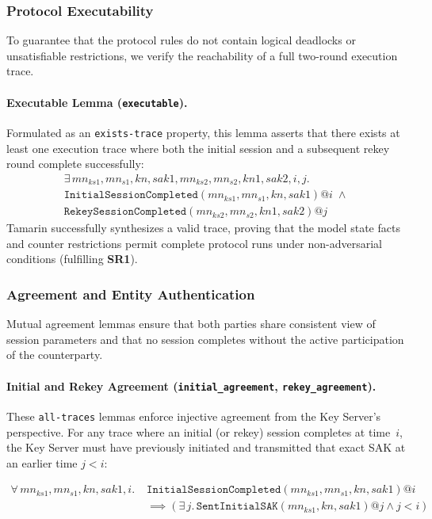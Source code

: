 \subsubsection{Protocol Executability}
To guarantee that the protocol rules do not contain logical deadlocks or unsatisfiable restrictions, we verify the reachability of a full two-round execution trace.

\paragraph{Executable Lemma (\texttt{executable}).} Formulated as an \texttt{exists-trace} property, this lemma asserts that there exists at least one execution trace where both the initial session and a subsequent rekey round complete successfully:
\begin{align*}
\exists \, \mathit{mn_{ks1}}, \mathit{mn_{s1}}, \mathit{kn}, \mathit{sak1}, \mathit{mn_{ks2}}, \mathit{mn_{s2}}, \mathit{kn1}, \mathit{sak2}, i, j. \\
\mathtt{InitialSessionCompleted}(\mathit{mn_{ks1}},\mathit{mn_{s1}},\mathit{kn},\mathit{sak1})@i \;\land \\
\mathtt{RekeySessionCompleted}(\mathit{mn_{ks2}},\mathit{mn_{s2}},\mathit{kn1},\mathit{sak2})@j
\end{align*}
Tamarin successfully synthesizes a valid trace, proving that the model state facts and counter restrictions permit complete protocol runs under non-adversarial conditions (fulfilling \textbf{SR1}).

\subsubsection{Agreement and Entity Authentication}
Mutual agreement lemmas ensure that both parties share consistent view of session parameters and that no session completes without the active participation of the counterparty.

\begin{sloppypar}
\paragraph{Initial and Rekey Agreement (\texttt{initial\_\allowbreak{}agreement}, \texttt{rekey\_\allowbreak{}agreement}).} These \texttt{all-traces} lemmas enforce injective agreement from the Key Server's perspective. For any trace where an initial (or rekey) session completes at time~$i$, the Key Server must have previously initiated and transmitted that exact SAK at an earlier time $j < i$:
\end{sloppypar}
{\small
\begin{equation*}
\begin{split}
\forall \, \mathit{mn_{ks1}}, \mathit{mn_{s1}}, \mathit{kn}, \mathit{sak1}, i. \; & \mathtt{InitialSessionCompleted}(\mathit{mn_{ks1}},\mathit{mn_{s1}},\mathit{kn},\mathit{sak1})@i \\
& \implies (\exists \, j. \, \mathtt{SentInitialSAK}(\mathit{mn_{ks1}},\mathit{kn},\mathit{sak1})@j \land j < i)
\end{split}
\end{equation*}}

